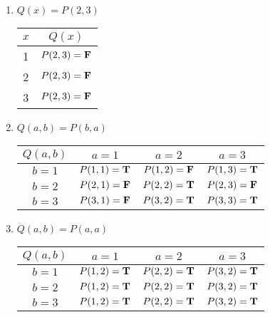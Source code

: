 \begin{solutions}
\begin{enumerate}
			\item $Q(x) = P(2,3)$
			
									\begin{table}[h!]
				\begin{center}
					\begin{tabular}{c|c}
						
						$x$ & $Q(x)$ \\
						\hline
						1 & $P(2,3) = \textbf{\textrm{F}}$ \\ 
						2 & $P(2,3) = \textbf{\textrm{F}}$ \\
						3 & $P(2,3) = \textbf{\textrm{F}}$ \\
					\end{tabular}
				\end{center}
			\end{table}
		
			\item $Q(a,b) = P(b,a)$
			
					\begin{table}[h!]
				\begin{center}
					\begin{tabular}{c|c|c|c|}
						$ Q(a,b)$        &$a=1$ & $a=2$ & $a=3$  \\
						\hline
						$b=1$ &    $P(1,1) = \textbf{\textrm{T}}$      &     $P(1,2) = \textbf{\textrm{F}}$      & $P(1,3) = \textbf{\textrm{T}}$        \\
						\hline
						$b=2$ &    $P(2,1) = \textbf{\textrm{F}}$      &     $P(2,2) = \textbf{\textrm{T}}$      & $P(2,3) = \textbf{\textrm{F}}$        \\
						\hline
						$b=3$ &    $P(3,1) = \textbf{\textrm{F}}$      &     $P(3,2) = \textbf{\textrm{T}}$      & $P(3,3) = \textbf{\textrm{T}}$        \\
						\hline
					\end{tabular}
				\end{center}
			\end{table}
			
			
			\item $Q(a,b) = P(a,a)$
			
								\begin{table}[h!]
				\begin{center}
					\begin{tabular}{c|c|c|c|}
						$ Q(a,b)$        &$a=1$ & $a=2$ & $a=3$  \\
						\hline
						$b=1$ &    $P(1,2) = \textbf{\textrm{T}}$      &     $P(2,2) = \textbf{\textrm{T}}$      & $P(3,2) = \textbf{\textrm{T}}$        \\
						\hline
						$b=2$ &    $P(1,2) = \textbf{\textrm{T}}$      &     $P(2,2) = \textbf{\textrm{T}}$      & $P(3,2) = \textbf{\textrm{T}}$        \\
						\hline
						$b=3$ &    $P(1,2) = \textbf{\textrm{T}}$      &     $P(2,2) = \textbf{\textrm{T}}$      & $P(3,2) = \textbf{\textrm{T}}$        \\
						\hline
					\end{tabular}
				\end{center}
			\end{table}
			
			
		\end{enumerate}
	\end{solutions}

